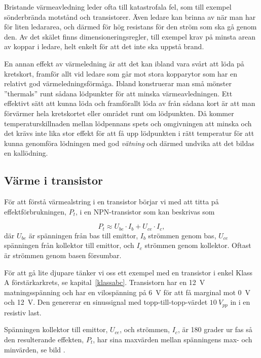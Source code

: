 Bristande värmeavledning leder ofta till katastrofala fel, som till exempel
sönderbrända motstånd och transistorer. Även ledare kan brinna av när man
har för liten ledararea, och därmed för hög resistans för den ström som
ska gå genom den. Av det skälet finns dimensioneringsregler, till exempel
krav på minsta arean av koppar i ledare, helt enkelt för att det inte ska
uppstå brand.

En annan effekt av värmeledning är att det kan ibland vara svårt att löda
på kretskort, framför allt vid ledare som går mot stora kopparytor som
har en relativt god värmeledningsförmåga. Ibland konstruerar man små mönster
''thermals'' runt sådana lödpunkter för att minska värmeavledningen.
Ett effektivt sätt att kunna löda och framförallt löda av från sådana
kort är att man förvärmer hela kretskortet eller området runt om
lödpunkten. Då kommer temperaturskillnaden mellan lödpennans spets och
omgivningen att minska och det krävs inte lika stor effekt för att få
upp lödpunkten i rätt temperatur för att kunna genomföra lödningen med god
\emph{vätning} och därmed undvika att det bildas en kallödning.

\subsection{Värme i transistor}


För att förstå värmealstring i en transistor börjar vi med att titta
på effektförbrukningen, \(P_t\), i en NPN-transistor som kan beskrivas
som

\[P_t \approx U_{be}\cdot I_b + U_{ce}\cdot I_c,\]
%
där \(U_{be}\) är spänningen från bas till emittor, \(I_b\)
strömmen genom bas,  \(U_{ce}\) spänningen från kollektor till
emittor, och \(I_c\) strömmen genom kollektor.
Oftast är strömmen genom basen försumbar.

För att gå lite djupare tänker vi oss ett exempel med en transistor i
enkel Klass A förstärkarkrets, se kapital~\ref{klassabc}.
Transistorn har en \qty{12}{\volt} matningsspänning och har en
vilospänning på \qty{6}{\volt} för att få marginal mot \qty{0}{\volt}
och \qty{+12}{\volt}.
Den genererar en sinussignal med topp-till-topp-värdet \(10\ V_{pp}\)
in i en resistiv last.

Spänningen kollektor till emittor, \(U_{ce}\), och strömmen, \(I_c\),
är 180 grader ur fas så den resulterande effekten, \(P_t\), har sina
maxvärden mellan spänningens max- och minvärden, se bild
.
